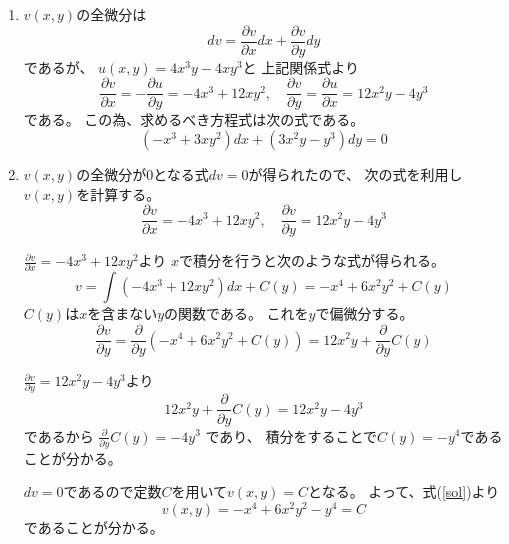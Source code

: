\documentclass[12pt,b5paper]{ltjsarticle}
\begin{document}
\begin{enumerate}
 \item
      $v(x,y)$の全微分は
      \begin{equation}
       dv
        =\frac{\partial v}{\partial x}dx
        + \frac{\partial v}{\partial y}dy
      \end{equation}
       であるが、
       $u(x,y)=4x^3y-4xy^3$と
       上記関係式より
       \begin{equation}
        \frac{\partial v}{\partial x}
         = -\frac{\partial u}{\partial y}
         = -4x^3 +12xy^2
         ,\quad
         \frac{\partial v}{\partial y}
         = \frac{\partial u}{\partial x}
         = 12x^2y-4y^3
       \end{equation}
       である。
       この為、求めるべき方程式は次の式である。
       \begin{equation}
        (-x^3+3xy^2)dx + (3x^2y-y^3)dy =0
       \end{equation}

 \item
      $v(x,y)$の全微分が0となる式$dv=0$が得られたので、
      次の式を利用し$v(x,y)$を計算する。
      \begin{equation}
        \frac{\partial v}{\partial x}
         = -4x^3 +12xy^2
         ,\quad
         \frac{\partial v}{\partial y}
         = 12x^2y-4y^3
      \end{equation}

      $\frac{\partial v}{\partial x}= -4x^3 +12xy^2$より
      $x$で積分を行うと次のような式が得られる。
      \begin{equation}
       v = \int (-4x^3 +12xy^2)dx +C(y)
        = -x^4 + 6x^2y^2 +C(y)
        \label{sol}
      \end{equation}
      $C(y)$は$x$を含まない$y$の関数である。
      これを$y$で偏微分する。
      \begin{equation}
       \frac{\partial v}{\partial y}
        =\frac{\partial}{\partial y}(-x^4 + 6x^2y^2 +C(y))
        = 12x^2y +\frac{\partial}{\partial y}C(y)
      \end{equation}

      $\frac{\partial v}{\partial y}= 12x^2y-4y^3$より
      \begin{equation}
       12x^2y +\frac{\partial}{\partial y}C(y)
        = 12x^2y-4y^3
      \end{equation}
      であるから
      $\frac{\partial}{\partial y}C(y)=-4y^3$
      であり、
      積分をすることで$C(y)=-y^4$であることが分かる。

      $dv=0$であるので定数$C$を用いて$v(x,y)=C$となる。
      よって、式(\ref{sol})より
      \begin{equation}
       v(x,y) = -x^4 + 6x^2y^2 -y^4 =C
      \end{equation}
      であることが分かる。

\end{enumerate}
\end{document}
